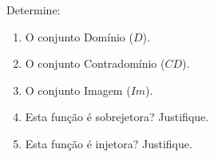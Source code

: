 \documentclass[12pt]{article}
\begin{document}
\begin{enumerate}[label=\arabic*), leftmargin=1.5cm, itemsep=1cm]
    Determine:
    \begin{enumerate}[label=\alph*)]
        \item O conjunto Domínio ($D$).
        \item O conjunto Contradomínio ($CD$).
        \item O conjunto Imagem ($Im$).
        \item Esta função é sobrejetora? Justifique.
        \item Esta função é injetora? Justifique.
    \end{enumerate}

\end{enumerate}
\end{document}
